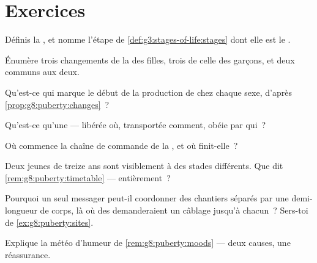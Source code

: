 \section{Exercices}

\begin{exercise}[$\star$]\label{exo:g8:puberty:1}
Définis la , et nomme l'étape de
\cref{def:g3:stages-of-life:stages} dont elle est le .
\end{exercise}

\begin{exercise}[$\star$]\label{exo:g8:puberty:2}
Énumère trois changements de la  des filles, trois de celle
des garçons, et deux communs aux deux.
\end{exercise}

\begin{exercise}[$\star$]\label{exo:g8:puberty:3}
Qu'est-ce qui marque le début de la production de  chez
chaque sexe, d'après \cref{prop:g8:puberty:changes}~?
\end{exercise}

\begin{exercise}[$\star$]\label{exo:g8:puberty:4}
Qu'est-ce qu'une  --- libérée où, transportée comment, obéie
par qui~?
\end{exercise}

\begin{exercise}[$\star$]\label{exo:g8:puberty:5}
Où commence la chaîne de commande de la , et où finit-elle~?
\end{exercise}

\begin{exercise}[$\star$]\label{exo:g8:puberty:6}
Deux jeunes de treize ans sont visiblement à des stades différents.
Que dit \cref{rem:g8:puberty:timetable} --- entièrement~?
\end{exercise}

\begin{exercise}[$\star\star$]\label{exo:g8:puberty:7}
Pourquoi un seul messager peut-il coordonner des chantiers séparés
par une demi-longueur de corps, là où des  demanderaient un
câblage jusqu'à chacun~? Sers-toi de \cref{ex:g8:puberty:sites}.
\end{exercise}

\begin{exercise}[$\star\star$]\label{exo:g8:puberty:8}
Explique la météo d'humeur de \cref{rem:g8:puberty:moods} --- deux
causes, une réassurance.
\end{exercise}

